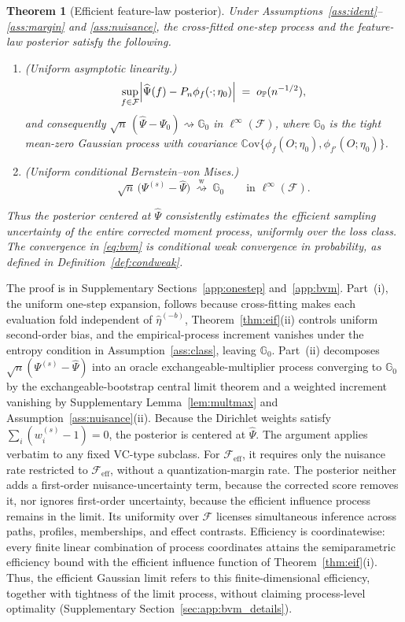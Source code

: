 \documentclass[11pt]{article}
\newtheorem{theorem}{Theorem}%
\newcommand{\Pp}{\mathbb P}
\newcommand{\G}{\mathbb G}
\newcommand{\Cov}{\mathbb C\mathrm{ov}}
\newcommand{\opro}{o_{\Pp}}
\newcommand{\dto}{\rightsquigarrow}
\newcommand{\dtow}{\overset{\mathrm w}{\rightsquigarrow}}
\newcommand{\calF}{\mathcal F}
\newcommand{\hateta}{\widehat\eta}
\newcommand{\hPsi}{\widehat\Psi}
\begin{document}
\begin{theorem}[Efficient feature-law posterior]\label{thm:bvm}
Under Assumptions~\ref{ass:ident}--\ref{ass:margin} and \ref{ass:nuisance}, the cross-fitted one-step process and the feature-law posterior satisfy the following.
\begin{enumerate}[label=(\roman*),leftmargin=2em]
\item \textup{(Uniform asymptotic linearity.)}
\begin{equation}\label{eq:linearity}
\sup_{f\in\calF}\Bigl|\hPsi(f)-P_n\phi_f(\cdot;\eta_0)\Bigr|\;=\;\opro(n^{-1/2}),
\end{equation}
and consequently $\sqrt n\,(\hPsi-\Psi_0)\dto\G_0$ in $\ell^\infty(\calF)$, where $\G_0$ is the tight mean-zero Gaussian process with covariance $\Cov\{\phi_f(O;\eta_0),\phi_{f'}(O;\eta_0)\}$.
\item \textup{(Uniform conditional Bernstein--von Mises.)}
\begin{equation}\label{eq:bvm}
\sqrt n\,\bigl(\Psi^{(s)}-\hPsi\bigr)\ \dtow\ \G_0
\qquad\text{in } \ell^\infty(\calF).
\end{equation}
\end{enumerate}
Thus the posterior centered at $\hPsi$ consistently estimates the efficient sampling uncertainty of the entire corrected moment process, uniformly over the loss class.  The convergence in \eqref{eq:bvm} is conditional weak convergence in probability, as defined in Definition~\ref{def:condweak}.
\end{theorem}
The proof is in Supplementary Sections~\ref{app:onestep} and~\ref{app:bvm}. Part~(i), the uniform one-step expansion, follows because cross-fitting makes each evaluation fold independent of $\hateta^{(-b)}$, Theorem~\ref{thm:eif}(ii) controls uniform second-order bias, and the empirical-process increment vanishes under the entropy condition in Assumption~\ref{ass:class}, leaving $\G_0$. Part~(ii) decomposes $\sqrt n(\Psi^{(s)}-\hPsi)$ into an oracle exchangeable-multiplier process converging to $\G_0$ by the exchangeable-bootstrap central limit theorem and a weighted increment vanishing by Supplementary Lemma~\ref{lem:multmax} and Assumption~\ref{ass:nuisance}(ii). Because the Dirichlet weights satisfy $\sum_i(w_i^{(s)}-1)=0$, the posterior is centered at $\hPsi$. The argument applies verbatim to any fixed VC-type subclass. For $\calF_{\mathrm{eff}}$, it requires only the nuisance rate restricted to $\calF_{\mathrm{eff}}$, without a quantization-margin rate.
The posterior neither adds a first-order nuisance-uncertainty term, because the corrected score removes it, nor ignores first-order uncertainty, because the efficient influence process remains in the limit. Its uniformity over $\calF$ licenses simultaneous inference across paths, profiles, memberships, and effect contrasts. Efficiency is coordinatewise: every finite linear combination of process coordinates attains the semiparametric efficiency bound with the efficient influence function of Theorem~\ref{thm:eif}(i). Thus, the efficient Gaussian limit refers to this finite-dimensional efficiency, together with tightness of the limit process, without claiming process-level optimality (Supplementary Section~\ref{sec:app:bvm_details}).
\end{document}

